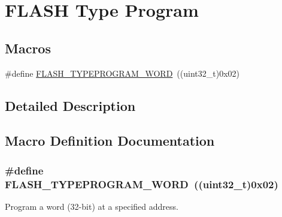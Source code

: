 \hypertarget{group___f_l_a_s_h___type___program}{\section{F\-L\-A\-S\-H Type Program}
\label{group___f_l_a_s_h___type___program}
}
\subsection*{Macros}
\begin{DoxyCompactItemize}
\item 
\#define \hyperlink{group___f_l_a_s_h___type___program_gadd25c6821539030ba6711e7c0d586c3e}{F\-L\-A\-S\-H\-\_\-\-T\-Y\-P\-E\-P\-R\-O\-G\-R\-A\-M\-\_\-\-W\-O\-R\-D}~((uint32\-\_\-t)0x02)
\end{DoxyCompactItemize}


\subsection{Detailed Description}


\subsection{Macro Definition Documentation}
\hypertarget{group___f_l_a_s_h___type___program_gadd25c6821539030ba6711e7c0d586c3e}{
\subsubsection[{F\-L\-A\-S\-H\-\_\-\-T\-Y\-P\-E\-P\-R\-O\-G\-R\-A\-M\-\_\-\-W\-O\-R\-D}]{\setlength{\rightskip}{0pt plus 5cm}\#define F\-L\-A\-S\-H\-\_\-\-T\-Y\-P\-E\-P\-R\-O\-G\-R\-A\-M\-\_\-\-W\-O\-R\-D~((uint32\-\_\-t)0x02)}}\label{group___f_l_a_s_h___type___program_gadd25c6821539030ba6711e7c0d586c3e}
Program a word (32-\/bit) at a specified address. 